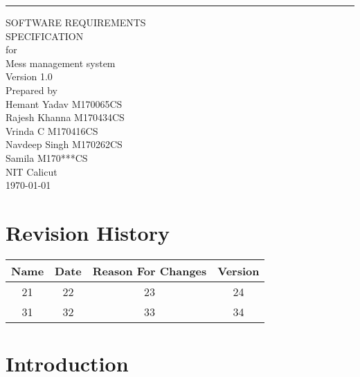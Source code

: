 \documentclass{scrreprt}
\date{}
\def\myversion{1.0 }
\begin{document}
\begin{flushright}
    \rule{16cm}{5pt}\vskip1cm
    \begin{bfseries}
        \Huge{SOFTWARE REQUIREMENTS\\ SPECIFICATION}\\
        \vspace{1.9cm}
        for\\
     Mess management system\\
       
        \LARGE{Version \myversion }\\
        \vspace{1.9cm}
        Prepared by\\ Hemant Yadav M170065CS\\
                    Rajesh Khanna M170434CS\\
                    Vrinda C M170416CS\\
                    Navdeep Singh M170262CS\\
                    Samila M170***CS\\
        \vspace{1.9cm}
        NIT Calicut\\
        \vspace{1.9cm}
        \today\\
    \end{bfseries}
\end{flushright}

\tableofcontents


\chapter*{Revision History}

\begin{center}
    \begin{tabular}{|c|c|c|c|}
        \hline
	    Name & Date & Reason For Changes & Version\\
        \hline
	    21 & 22 & 23 & 24\\
        \hline
	    31 & 32 & 33 & 34\\
        \hline
    \end{tabular}
\end{center}

\chapter{Introduction}
\end{document}
